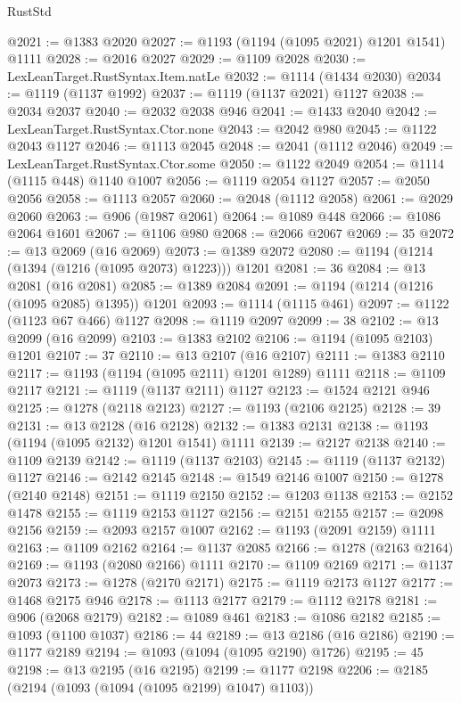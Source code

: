 \begin{lexlean}{RustStd}
\begin{coremodule}
@2021 := @1383 @2020
@2027 := @1193 (@1194 (@1095 @2021) @1201 @1541) @1111
@2028 := @2016 @2027
@2029 := @1109 @2028
@2030 := LexLeanTarget.RustSyntax.Item.natLe
@2032 := @1114 (@1434 @2030)
@2034 := @1119 (@1137 @1992)
@2037 := @1119 (@1137 @2021) @1127
@2038 := @2034 @2037
@2040 := @2032 @2038 @946
@2041 := @1433 @2040
@2042 := LexLeanTarget.RustSyntax.Ctor.none
@2043 := @2042 @980
@2045 := @1122 @2043 @1127
@2046 := @1113 @2045
@2048 := @2041 (@1112 @2046)
@2049 := LexLeanTarget.RustSyntax.Ctor.some
@2050 := @1122 @2049
@2054 := @1114 (@1115 @448) @1140 @1007
@2056 := @1119 @2054 @1127
@2057 := @2050 @2056
@2058 := @1113 @2057
@2060 := @2048 (@1112 @2058)
@2061 := @2029 @2060
@2063 := @906 (@1987 @2061)
@2064 := @1089 @448
@2066 := @1086 @2064 @1601
@2067 := @1106 @980
@2068 := @2066 @2067
@2069 := 35
@2072 := @13 @2069 (@16 @2069)
@2073 := @1389 @2072
@2080 := @1194 (@1214 (@1394 (@1216 (@1095 @2073) @1223))) @1201
@2081 := 36
@2084 := @13 @2081 (@16 @2081)
@2085 := @1389 @2084
@2091 := @1194 (@1214 (@1216 (@1095 @2085) @1395)) @1201
@2093 := @1114 (@1115 @461)
@2097 := @1122 (@1123 @67 @466) @1127
@2098 := @1119 @2097
@2099 := 38
@2102 := @13 @2099 (@16 @2099)
@2103 := @1383 @2102
@2106 := @1194 (@1095 @2103) @1201
@2107 := 37
@2110 := @13 @2107 (@16 @2107)
@2111 := @1383 @2110
@2117 := @1193 (@1194 (@1095 @2111) @1201 @1289) @1111
@2118 := @1109 @2117
@2121 := @1119 (@1137 @2111) @1127
@2123 := @1524 @2121 @946
@2125 := @1278 (@2118 @2123)
@2127 := @1193 (@2106 @2125)
@2128 := 39
@2131 := @13 @2128 (@16 @2128)
@2132 := @1383 @2131
@2138 := @1193 (@1194 (@1095 @2132) @1201 @1541) @1111
@2139 := @2127 @2138
@2140 := @1109 @2139
@2142 := @1119 (@1137 @2103)
@2145 := @1119 (@1137 @2132) @1127
@2146 := @2142 @2145
@2148 := @1549 @2146 @1007
@2150 := @1278 (@2140 @2148)
@2151 := @1119 @2150
@2152 := @1203 @1138
@2153 := @2152 @1478
@2155 := @1119 @2153 @1127
@2156 := @2151 @2155
@2157 := @2098 @2156
@2159 := @2093 @2157 @1007
@2162 := @1193 (@2091 @2159) @1111
@2163 := @1109 @2162
@2164 := @1137 @2085
@2166 := @1278 (@2163 @2164)
@2169 := @1193 (@2080 @2166) @1111
@2170 := @1109 @2169
@2171 := @1137 @2073
@2173 := @1278 (@2170 @2171)
@2175 := @1119 @2173 @1127
@2177 := @1468 @2175 @946
@2178 := @1113 @2177
@2179 := @1112 @2178
@2181 := @906 (@2068 @2179)
@2182 := @1089 @461
@2183 := @1086 @2182
@2185 := @1093 (@1100 @1037)
@2186 := 44
@2189 := @13 @2186 (@16 @2186)
@2190 := @1177 @2189
@2194 := @1093 (@1094 (@1095 @2190) @1726)
@2195 := 45
@2198 := @13 @2195 (@16 @2195)
@2199 := @1177 @2198
@2206 := @2185 (@2194 (@1093 (@1094 (@1095 @2199) @1047) @1103))

\end{coremodule}
\end{lexlean}

